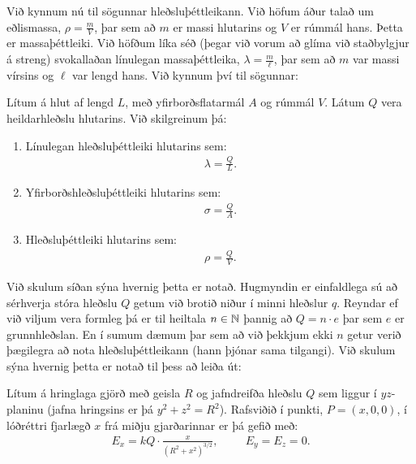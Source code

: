 Við kynnum nú til sögunnar hleðsluþéttleikann. Við höfum áður talað um eðlismassa, $\rho = \frac{m}{V}$, þar sem að $m$ er massi hlutarins og $V$ er rúmmál hans. Þetta er massaþéttleiki. Við höfðum líka séð (þegar við vorum að glíma við staðbylgjur á streng) svokallaðan línulegan massaþéttleika, $\lambda = \frac{m}{\ell}$, þar sem að $m$ var massi vírsins og $\ell$ var lengd hans. Við kynnum því til sögunnar:


\begin{tcolorbox}
\begin{definition}
Lítum á hlut af lengd $L$, með yfirborðsflatarmál $A$ og rúmmál $V$. Látum $Q$ vera heildarhleðslu hlutarins. Við skilgreinum þá:
\begin{enumerate}[label = \textbf{(\roman*)}]
    \item Línulegan hleðsluþéttleiki hlutarins sem:
    \begin{align*}
        \lambda = \frac{Q}{L}.
    \end{align*}
    \item Yfirborðshleðsluþéttleiki hlutarins sem:
    \begin{align*}
        \sigma = \frac{Q}{A}.
    \end{align*}
    
    \item Hleðsluþéttleiki hlutarins sem:
    \begin{align*}
        \rho = \frac{Q}{V}.
    \end{align*}
\end{enumerate}
\end{definition}
\end{tcolorbox}

Við skulum síðan sýna hvernig þetta er notað. Hugmyndin er einfaldlega sú að sérhverja stóra hleðslu $Q$ getum við brotið niður í minni hleðslur $q$. Reyndar ef við viljum vera formleg þá er til heiltala $n \in \mathbb{N}$ þannig að $Q = n\cdot e$ þar sem $e$ er grunnhleðslan. En í sumum dæmum þar sem að við þekkjum ekki $n$ getur verið þægilegra að nota hleðsluþéttleikann (hann þjónar sama tilgangi). Við skulum sýna hvernig þetta er notað til þess að leiða út:

\begin{tcolorbox}
\begin{theorem}
Lítum á hringlaga gjörð með geisla $R$ og jafndreifða hleðslu $Q$ sem liggur í $yz$-planinu (jafna hringsins er þá $y^2 + z^2 = R^2$). Rafsviðið í punkti, $P = (x,0,0)$, í lóðréttri fjarlægð $x$ frá miðju gjarðarinnar er þá gefið með:
\begin{align*}
    E_x = kQ \cdot \frac{x}{(R^2 +x^2)^{3/2}}, \hspace{1cm} E_y = E_z = 0.
\end{align*}
\end{theorem}
\end{tcolorbox}
    
